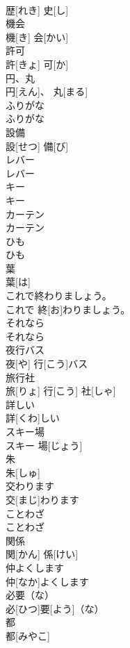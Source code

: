 \documentclass[8pt]{extreport}
\begin{document}
\begin{CJK}{UTF8}{min}
\\	歴[れき] 史[し]		
\\	機会	
\\	機[き] 会[かい]		
\\	許可	
\\	許[きょ] 可[か]		
\\	円、丸	
\\	円[えん]、 丸[まる]		
\\	ふりがな	
\\	ふりがな		
\\	設備	
\\	設[せつ] 備[び]		
\\	レバー	
\\	レバー		
\\	キー	
\\	キー		
\\	カーテン	
\\	カーテン		
\\	ひも	
\\	ひも		
\\	葉	
\\	葉[は]		
\\	これで終わりましょう。	
\\	これで 終[お]わりましょう。		
\\	それなら	
\\	それなら		
\\	夜行バス	
\\	夜[や] 行[こう]バス		
\\	旅行社	
\\	旅[りょ] 行[こう] 社[しゃ]		
\\	詳しい	
\\	詳[くわ]しい		
\\	スキー場	
\\	スキー 場[じょう]		
\\	朱	
\\	朱[しゅ]		
\\	交わります	
\\	交[まじ]わります		
\\	ことわざ	
\\	ことわざ		
\\	関係	
\\	関[かん] 係[けい]		
\\	仲よくします	
\\	仲[なか]よくします		
\\	必要（な）	
\\	必[ひつ]要[よう]（な）		
\\	都	
\\	都[みやこ]		

\end{CJK}
\end{document}
